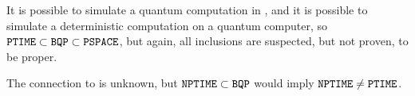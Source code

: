 It is possible to simulate a quantum computation in \PSPACE, and it is 
possible to simulate a deterministic computation on a quantum computer, so 
$\mathtt{PTIME} \subset \mathtt{BQP} \subset \mathtt{PSPACE}$, but again, all inclusions are 
suspected, but not proven, to be proper.

The connection to \NPTIME is unknown, but $\mathtt{NPTIME}\subset \mathtt{BQP}$ would 
imply $\mathtt{NPTIME}\neq \mathtt{PTIME}$.